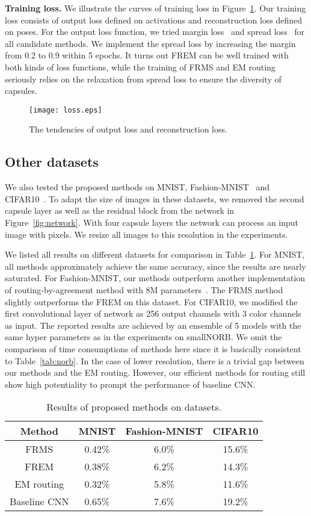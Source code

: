 \documentclass[runningheads]{llncs}
\begin{document}
\textbf{Training loss.} We illustrate the curves of training loss in Figure~\ref{fig:loss}. Our training loss consists of output loss defined on activations and reconstruction loss defined on poses. For the output loss function, we tried margin loss~\cite{sabour2017dynamic} and spread loss~\cite{hinton2018emrouting} for all candidate methods. We implement the spread loss by increasing the margin from 0.2 to 0.9 within 5 epochs. It turns out FREM can be well trained with both kinds of loss functions, while the training of FRMS and EM routing seriously relies on the relaxation from spread loss to ensure the diversity of capsules.
\begin{figure}
\centering
\texttt{[image: loss.eps]}
\caption{The tendencies of output loss and reconstruction loss.}
\label{fig:loss}
\end{figure}

\subsection{Other datasets}
We also tested the proposed methods on MNIST, Fashion-MNIST~\cite{xiao2017online} and CIFAR10~\cite{krizhevsky2009learning}. To adapt the size of images in these datasets, we removed the second capsule layer as well as the residual block from the network in Figure~\ref{fig:network}. With four capsule layers the network can process an input image with  pixels. We resize all images to this resolution in the experiments.

We listed all results on different datasets for comparison in Table~\ref{tab:datasets}. For MNIST, all methods approximately achieve the same accuracy, since the results are nearly saturated. For Fashion-MNIST, our methods outperform another implementation of routing-by-agreement method with 8M parameters~\cite{xiao2017online}. The FRMS method slightly outperforms the FREM on this dataset. For CIFAR10, we modified the first  convolutional layer of network as 256 output channels with 3 color channels as input. The reported results are achieved by an ensemble of 5 models with the same hyper parameters as in the experiments on smallNORB. We omit the comparison of time consumptions of methods here since it is basically consistent to Table~\ref{tab:norb}. In the case of lower resolution, there is a trivial gap between our methods and the EM routing. However, our efficient methods for routing still show high potentiality to prompt the performance of baseline CNN.   
\begin{table}
\centering
\caption{Results of proposed methods on datasets.}
\label{tab:datasets}
\begin{tabular}{cccc}
\toprule
Method & MNIST & Fashion-MNIST & CIFAR10 \\
\midrule
FRMS & 0.42\% & 6.0\% & 15.6\% \\
FREM & 0.38\% & 6.2\% & 14.3\% \\
EM routing & 0.32\% & 5.8\% & 11.6\% \\
Baseline CNN & 0.65\% & 7.6\% & 19.2\% \\
\bottomrule
\end{tabular}
\end{table}
\end{document}

